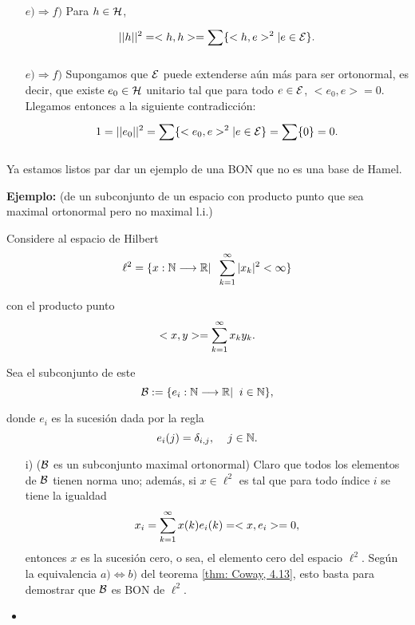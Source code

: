 \begin{itemize}
\item[$e) \Rightarrow f)$] Para $h \in \mathcal{H}$,
\[
||h||^{2}=<h,h> = \sum\limits_{}^{}\{ <h,e>^{2}| e \in \mathcal{E} \}.
\]

\item[$e) \Rightarrow f)$]
Supongamos que $\mathcal{E}$ puede extenderse aún más
para ser ortonormal, es decir, que existe 
$e_{0} \in \mathcal{H}$ unitario tal que
para todo $e \in \mathcal{E}$, $<e_{0}, e>=0$. 
Llegamos entonces a la siguiente contradicción:
\[
1=||e_{0}||^{2}=\sum\limits_{}^{}\{ <e_{0}, e>^{2}| e \in \mathcal{E} \}=
\sum\limits_{}^{}\{ 0\}=0.
\]
\QEDB
\end{itemize}
\vspace{0.2cm}

Ya estamos listos par dar un ejemplo de una BON que
no es una base de Hamel.


\textbf{Ejemplo:}
(de un subconjunto de un espacio
con producto punto que sea maximal ortonormal pero no maximal l.i.)

Considere al espacio de Hilbert
\[
\ell^{2}= \{ x: \mathbb{N} \longrightarrow \mathbb{R} | \hspace{0.2cm} 
\sum\limits_{k=1}^{\infty}|x_{k}|^{2}< \infty \}
\]

con el producto punto
\[
<x,y>= \sum\limits_{k=1}^{\infty}x_{k}y_{k}.
\]

Sea el subconjunto de este
\[
\mathcal{B}:= \{e_{i}: \mathbb{N} \longrightarrow \mathbb{R}| \hspace{0.2cm} i \in \mathbb{N} \},
\]

donde $e_{i}$ es la sucesión dada por la regla
\[
e_{i}(j)=\delta_{i,j}, \hspace{0.4cm} j \in \mathbb{N}.
\]


\begin{itemize}
\item[i)]($\mathcal{B}$ es un subconjunto maximal ortonormal) 
Claro que todos los elementos de $\mathcal{B}$ tienen norma uno;
además, si $x \in \ell^{2}$ es tal que para todo índice $i$
se tiene la igualdad
\[
x_{i}= \sum\limits_{k=1}^{\infty}x(k)e_{i}(k)=<x,e_{i}>=0,
\]
entonces $x$ es la sucesión cero, o sea,
el elemento cero del espacio
$\ell^{2}$. Según la equivalencia
$a) \iff b)$ del teorema \ref{thm: Coway, 4.13}, esto basta
para demostrar que $\mathcal{B}$ es BON de $\ell^{2}$.

\item

\end{itemize}


